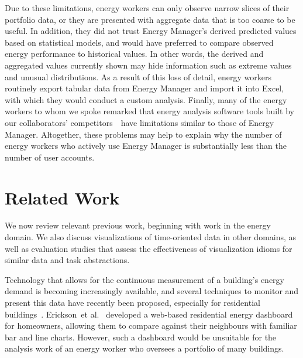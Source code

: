 \documentclass[journal]{vgtc}                %
\newcommand{\bstart}[1]{\vspace{1mm} \noindent{\textbf{#1:}}}
\newcommand{\etal}{et al.}
\begin{document}
\bstart{Summary} Due to these limitations, energy workers can only observe narrow slices of their portfolio data, or they are presented with aggregate data that is too coarse to be useful.
In addition, they did not trust Energy Manager's derived predicted values based on statistical models, and would have preferred to compare observed energy performance to historical values.
In other words, the derived and aggregated values currently shown may hide information such as extreme values and unusual distributions.
As a result of this loss of detail, energy workers routinely export tabular data from Energy Manager and import it into Excel, with which they would conduct a custom analysis.
Finally, many of the energy workers to whom we spoke remarked that energy analysis software tools built by our collaborators' competitors~\cite{Energent,Northwrite,Schneider}~have limitations similar to those of Energy Manager.
Altogether, these problems may help to explain why the number of energy workers who actively use Energy Manager is substantially less than the number of user accounts.


\section{Related Work}
\label{related-work}


We now review relevant previous work, beginning with work in the energy domain. 
We also discuss visualizations of time-oriented data in other domains, as well as evaluation studies that assess the effectiveness of visualization idioms for similar data and task abstractions.

\bstart{Visualization in the energy domain} Technology that allows for the continuous measurement of a building's energy demand is becoming increasingly available, and several techniques to monitor and present this data have recently been proposed, especially for residential buildings~\cite{Ellegard2011,Erickson2013,Goodwin2013,Rodgers2011}.
Erickson~\etal~\cite{Erickson2013} developed a web-based residential energy dashboard for homeowners, allowing them to compare against their neighbours with familiar bar and line charts.
However, such a dashboard would be unsuitable for the analysis work of an energy worker who oversees a portfolio of many buildings.
\end{document}
